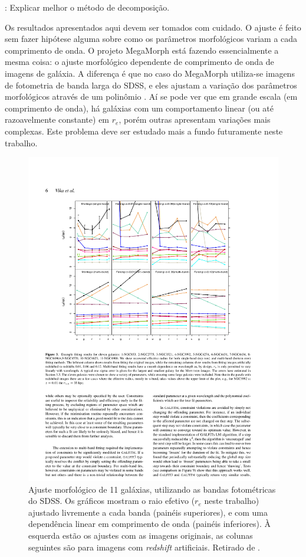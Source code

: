 \TODO: Explicar melhor o método de decomposição.

Os resultados apresentados aqui devem ser tomados com cuidado. O ajuste é feito
sem fazer hipótese alguma sobre como os parâmetros morfológicos variam a cada
comprimento de onda. O projeto MegaMorph \citep{Haussler2013} está fazendo
essencialmente a mesma coisa: o ajuste morfológico dependente de comprimento de
onda de imagens de galáxia. A diferença é que no caso do MegaMorph utiliza-se
imagens de fotometria de banda larga do SDSS, e eles ajustam a variação dos
parâmetros morfológicos através de um polinômio \citep[Figura
\ref{fig:propertiesVika}]{Vika2013}. Aí se pode ver que em grande escala (em
comprimento de onda), há galáxias com um comportamento linear (ou até
razoavelmente constante) em $r_e$, porém outras apresentam variações mais
complexas. Este problema deve ser estudado mais a fundo futuramente neste
trabalho.

\begin{figure}
	\includegraphics{figuras/vika-properties}
	\caption[Ajuste morfológico de bandas fotométricas] {Ajuste
	morfológico de 11 galáxias, utilizando as bandas fotométricas do
	SDSS. Os gráficos mostram o raio efetivo ($r_e$ neste trabalho) ajustado
	livremente a cada banda (painéis superiores), e com uma dependência linear em
	comprimento de onda (painéis inferiores). À esquerda estão os ajustes com as
	imagens originais, as colunas seguintes são para imagens com {\em redshift}
	artificiais. Retirado de \citet{Vika2013}.}
	\label{fig:propertiesVika}
\end{figure}

